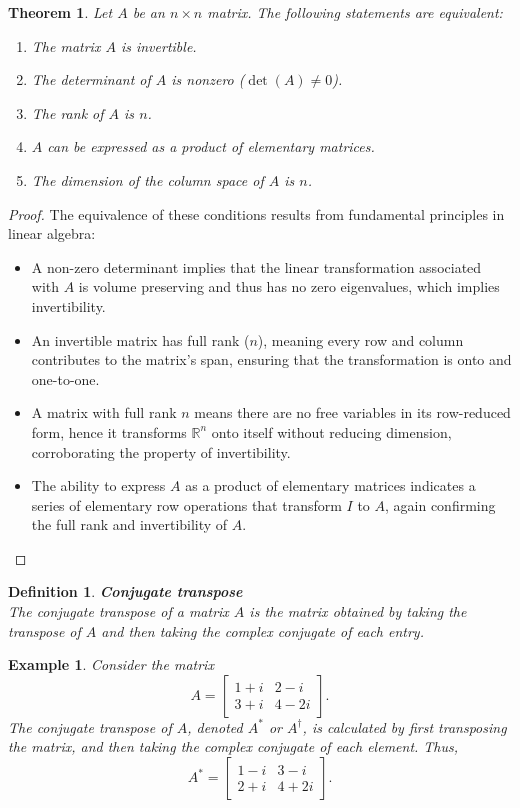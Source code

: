 \documentclass[11pt]{book} %
\newtheorem{theorem}{Theorem}[section]
\newtheorem{definition}{Definition}[section]
\newtheorem{example}{Example}[section]
\begin{document}
\begin{theorem}
Let \( A \) be an \( n \times n \) matrix. The following statements are equivalent:
\begin{enumerate}
    \item The matrix \( A \) is invertible.
    \item The determinant of \( A \) is nonzero (\( \det(A) \neq 0 \)).
    \item The rank of \( A \) is \( n \).
    \item \( A \) can be expressed as a product of elementary matrices.
    \item The dimension of the column space of \( A \) is \( n \).
\end{enumerate}
\end{theorem}

\begin{proof}
The equivalence of these conditions results from fundamental principles in linear algebra:
\begin{itemize}
    \item A non-zero determinant implies that the linear transformation associated with \( A \) is volume preserving and thus has no zero eigenvalues, which implies invertibility.
    \item An invertible matrix has full rank (\( n \)), meaning every row and column contributes to the matrix's span, ensuring that the transformation is onto and one-to-one.
    \item A matrix with full rank \( n \) means there are no free variables in its row-reduced form, hence it transforms \( \mathbb{R}^n \) onto itself without reducing dimension, corroborating the property of invertibility.
    \item The ability to express \( A \) as a product of elementary matrices indicates a series of elementary row operations that transform \( I \) to \( A \), again confirming the full rank and invertibility of \( A \).
\end{itemize}
\end{proof}



\begin{definition}{\textbf{Conjugate transpose}} \\
    The conjugate transpose of a matrix \( A \) is the matrix obtained by taking the transpose of \( A \) and then taking the complex conjugate of each entry.
\end{definition}

\begin{example}
    Consider the matrix 
    \[
    A = \begin{bmatrix} 1+i & 2-i \\ 3+i & 4-2i \end{bmatrix}.
    \]
    The conjugate transpose of \( A \), denoted \( A^* \) or \( A^\dagger \), is calculated by first transposing the matrix, and then taking the complex conjugate of each element. Thus,
    \[
    A^* = \begin{bmatrix} 1-i & 3-i \\ 2+i & 4+2i \end{bmatrix}.
    \]
\end{example}
\end{document}
